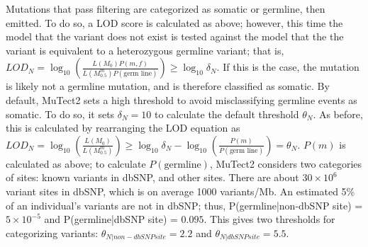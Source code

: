 Mutations that pass filtering are categorized as somatic or germline, then emitted. To do so, a LOD score is calculated as above; however, this time the model that the variant does not exist is tested against the model that the the variant is equivalent to a heterozygous germline variant; that is, $LOD_N=\log_{10} \left(\frac{L(M_0)P(m,f)}{L(M_{0.5}^m)P(\text{germ line})}\right) \geq \log_{10} \delta{}_N$. If this is the case, the mutation is likely not a germline mutation, and is therefore classified as somatic. By default, MuTect2 sets a high threshold to avoid misclassifying germline events as somatic. To do so, it sets $\delta{}_N = 10$ to calculate the default threshold $\theta{}_N$. As before, this is calculated by rearranging the LOD equation as $LOD_N = \log_{10} \left(\frac{L(M_0)}{L(M_{0.5}^m)}\right) \geq \log_{10} \delta{}_N - \log_{10} \left(\frac{P(m)}{P(\text{germ line})}\right) = \theta{}_N$. $P(m)$ is calculated as above; to calculate $P(\text{germline})$, MuTect2 considers two categories of sites: known variants in dbSNP, and other sites. There are about $30 \times 10^6$ variant sites in dbSNP, which is on average 1000 variants/Mb. An estimated 5\% of an individual's variants are not in dbSNP; thus, P(germline|non-dbSNP site) = $5 \times 10^{-5}$ and P(germline|dbSNP site) = $0.095$. This gives two thresholds for categorizing variants: $\theta{}_{N|non-dbSNP site} = 2.2$ and $\theta{}_{N|dbSNP site} = 5.5$.


